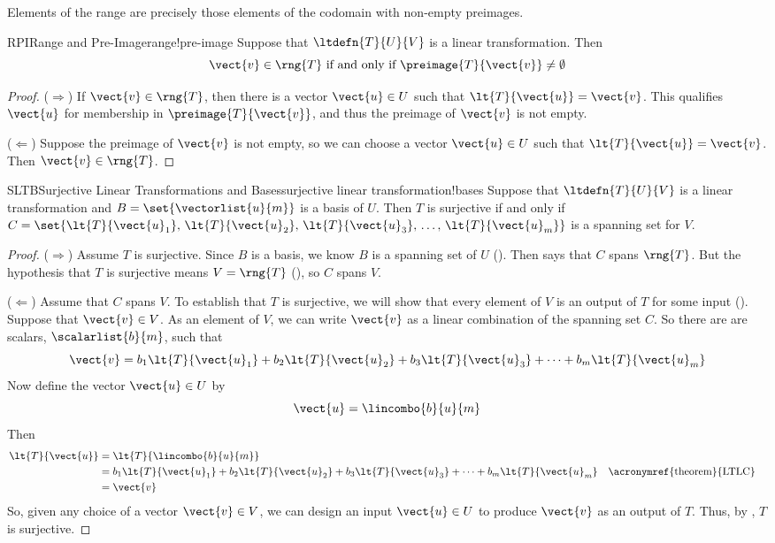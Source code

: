 %
Elements of the range are precisely those elements of the codomain with non-empty preimages.
%
\begin{theorem}{RPI}{Range and Pre-Image}{range!pre-image}
Suppose that $\ltdefn{T}{U}{V}$ is a linear transformation.  Then
%
\begin{equation*}
\vect{v}\in\rng{T}\text{ if and only if }\preimage{T}{\vect{v}}\neq\emptyset
\end{equation*}
%
\end{theorem}
%
\begin{proof}
($\Rightarrow$)  If $\vect{v}\in\rng{T}$, then there is a vector $\vect{u}\in U$ such that $\lt{T}{\vect{u}}=\vect{v}$.  This qualifies $\vect{u}$ for membership in $\preimage{T}{\vect{v}}$, and thus the preimage of $\vect{v}$ is not empty.\par
%
($\Leftarrow$)  Suppose the preimage of $\vect{v}$ is not empty, so we can choose a vector $\vect{u}\in U$ such that $\lt{T}{\vect{u}}=\vect{v}$.  Then $\vect{v}\in\rng{T}$.
%
\end{proof}
%
\begin{theorem}{SLTB}{Surjective Linear Transformations and Bases}{surjective linear transformation!bases}
Suppose that $\ltdefn{T}{U}{V}$ is a linear transformation and $B=\set{\vectorlist{u}{m}}$ is a basis of $U$.  Then $T$ is surjective if and only if $C=\set{\lt{T}{\vect{u}_1},\,\lt{T}{\vect{u}_2},\,\lt{T}{\vect{u}_3},\,\ldots,\,\lt{T}{\vect{u}_m}}$ is a spanning set for $V$.
\end{theorem}
%
\begin{proof}
%
($\Rightarrow$)  Assume $T$ is surjective.  Since $B$ is a basis, we know $B$ is a spanning set of $U$ ().  Then  says that $C$ spans $\rng{T}$.  But the hypothesis that $T$ is surjective means $V=\rng{T}$ (), so $C$ spans $V$.\par
%
($\Leftarrow$)  Assume that $C$ spans $V$.  To establish that $T$ is surjective, we will show that every element of $V$ is an output of $T$ for some input ().  Suppose that $\vect{v}\in V$.  As an element of $V$, we can write $\vect{v}$ as a linear combination of the spanning set $C$.  So there are are scalars, $\scalarlist{b}{m}$, such that
%
\begin{equation*}
\vect{v}=b_1\lt{T}{\vect{u}_1}+b_2\lt{T}{\vect{u}_2}+b_3\lt{T}{\vect{u}_3}+\cdots+b_m\lt{T}{\vect{u}_m}
\end{equation*}
%
Now define the vector $\vect{u}\in U$ by
%
\begin{equation*}
\vect{u}=\lincombo{b}{u}{m}
\end{equation*}
%
Then
%
\begin{align*}
\lt{T}{\vect{u}}&=\lt{T}{\lincombo{b}{u}{m}}\\
&=b_1\lt{T}{\vect{u}_1}+b_2\lt{T}{\vect{u}_2}+b_3\lt{T}{\vect{u}_3}+\cdots+b_m\lt{T}{\vect{u}_m}&&\text{\acronymref{theorem}{LTLC}}\\
&=\vect{v}
\end{align*}
%
So, given any choice of a vector $\vect{v}\in V$, we can design an input $\vect{u}\in U$ to produce $\vect{v}$ as an output of $T$.  Thus, by , $T$ is surjective.
%
\end{proof}
